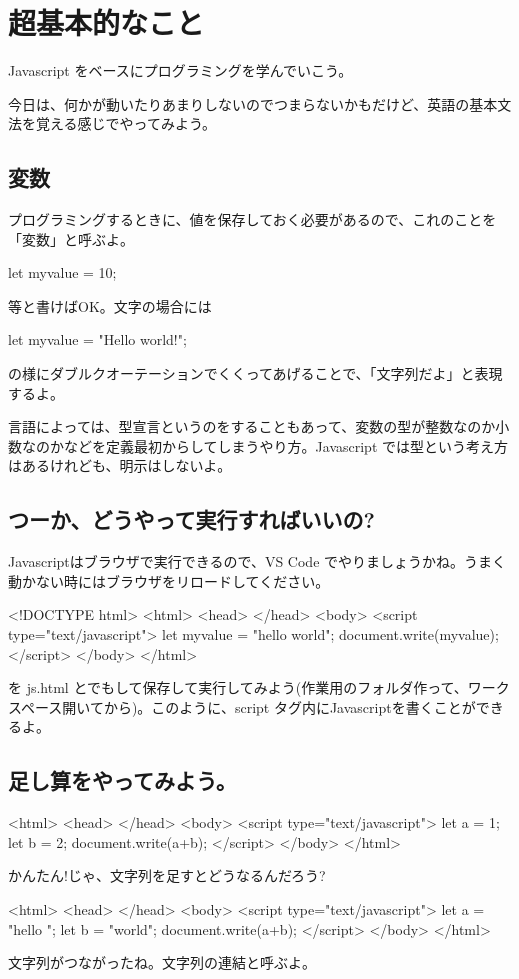 \documentclass[mingoth,11pt,a4j,uplatex]{jsarticle}
\begin{document}
\section{超基本的なこと}
Javascript をベースにプログラミングを学んでいこう。

今日は、何かが動いたりあまりしないのでつまらないかもだけど、英語の基本文法を覚える感じでやってみよう。

\subsection{変数}
プログラミングするときに、値を保存しておく必要があるので、これのことを「変数」と呼ぶよ。
\begin{verbatimtab}
	let myvalue = 10;
\end{verbatimtab}
等と書けばOK。文字の場合には
\begin{verbatimtab}
	let myvalue = "Hello world!";
\end{verbatimtab}
の様にダブルクオーテーションでくくってあげることで、「文字列だよ」と表現するよ。

言語によっては、型宣言というのをすることもあって、変数の型が整数なのか小数なのかなどを定義最初からしてしまうやり方。Javascript では型という考え方はあるけれども、明示はしないよ。

\subsection{つーか、どうやって実行すればいいの?}
Javascriptはブラウザで実行できるので、VS Code でやりましょうかね。うまく動かない時にはブラウザをリロードしてください。

\begin{verbatimtab}
<!DOCTYPE html>
<html>
	<head>
	</head>
	<body>
		<script type="text/javascript">
			let myvalue = "hello world";
			document.write(myvalue);
		</script>
	</body>
</html>
\end{verbatimtab}
を js.html とでもして保存して実行してみよう(作業用のフォルダ作って、ワークスペース開いてから)。このように、script タグ内にJavascriptを書くことができるよ。 

\subsection{足し算をやってみよう。}
\begin{verbatimtab}
<html>
	<head>
	</head>
	<body>
		<script type="text/javascript">
			let a = 1;
			let b = 2;
			document.write(a+b);
		</script>
	</body>
</html>
\end{verbatimtab}
かんたん!じゃ、文字列を足すとどうなるんだろう?
 \begin{verbatimtab}
 <html>
	<head>
	</head>
	<body>
		<script type="text/javascript">
			let a = "hello ";
			let b = "world";
			document.write(a+b);
		</script>
	</body>
</html>
\end{verbatimtab}
文字列がつながったね。文字列の連結と呼ぶよ。
\end{document}
